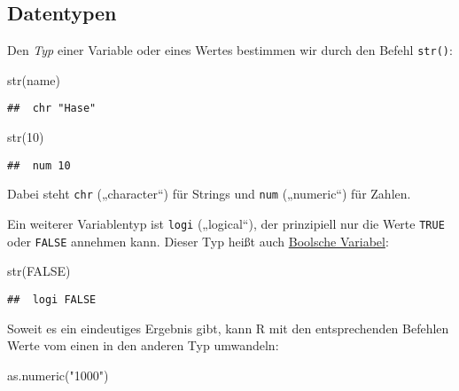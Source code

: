 \documentclass[11pt,german,a4paper]{article}
\newenvironment{Shaded}{\begin{snugshade}}{\end{snugshade}}
\newcommand{\ConstantTok}[1]{\textcolor[rgb]{0.00,0.00,0.00}{#1}}
\newcommand{\DecValTok}[1]{\textcolor[rgb]{0.00,0.00,0.81}{#1}}
\newcommand{\FunctionTok}[1]{\textcolor[rgb]{0.00,0.00,0.00}{#1}}
\newcommand{\NormalTok}[1]{#1}
\newcommand{\StringTok}[1]{\textcolor[rgb]{0.31,0.60,0.02}{#1}}
\begin{document}
\hypertarget{datentypen}{%
\subsection{Datentypen}\label{datentypen}}

Den \emph{Typ} einer Variable oder eines Wertes bestimmen wir durch den Befehl \texttt{str()}:

\begin{Shaded}
\begin{Highlighting}[]
\FunctionTok{str}\NormalTok{(name)}
\end{Highlighting}
\end{Shaded}

\begin{verbatim}
##  chr "Hase"
\end{verbatim}

\begin{Shaded}
\begin{Highlighting}[]
\FunctionTok{str}\NormalTok{(}\DecValTok{10}\NormalTok{)}
\end{Highlighting}
\end{Shaded}

\begin{verbatim}
##  num 10
\end{verbatim}

Dabei steht \texttt{chr} („character``) für Strings und \texttt{num} („numeric``) für Zahlen.

Ein weiterer Variablentyp ist \texttt{logi} („logical``), der prinzipiell nur die Werte \texttt{TRUE} oder \texttt{FALSE} annehmen kann. Dieser Typ heißt auch \href{https://de.wikipedia.org/wiki/Boolesche_Variable}{Boolsche Variabel}:

\begin{Shaded}
\begin{Highlighting}[]
\FunctionTok{str}\NormalTok{(}\ConstantTok{FALSE}\NormalTok{)}
\end{Highlighting}
\end{Shaded}

\begin{verbatim}
##  logi FALSE
\end{verbatim}

Soweit es ein eindeutiges Ergebnis gibt, kann R mit den entsprechenden Befehlen Werte vom einen in den anderen Typ umwandeln:

\begin{Shaded}
\begin{Highlighting}[]
\FunctionTok{as.numeric}\NormalTok{(}\StringTok{"1000"}\NormalTok{)}
\end{Highlighting}
\end{Shaded}
\end{document}
